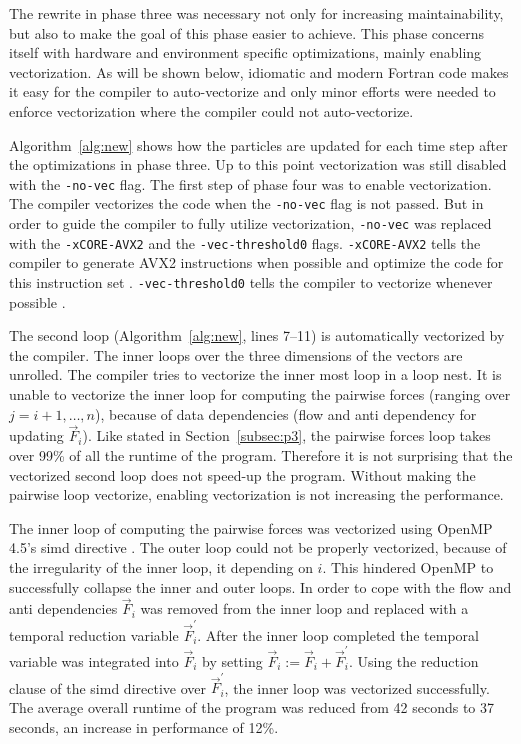 \documentclass[twoside,11pt]{article}
\begin{document}
The rewrite in phase three was necessary not only for increasing
maintainability, but also to make the goal of this phase easier to
achieve.
This phase concerns itself with hardware and environment specific
optimizations, mainly enabling vectorization.
As will be shown below, idiomatic and modern Fortran code makes it
easy for the compiler to auto-vectorize and only minor efforts were
needed to enforce vectorization where the compiler could not
auto-vectorize.

Algorithm~\ref{alg:new} shows how the particles are updated for each
time step after the optimizations in phase three.
Up to this point vectorization was still disabled with the
\texttt{-no-vec} flag.
The first step of phase four was to enable vectorization.
The compiler vectorizes the code when the \texttt{-no-vec} flag is
not passed.
But in order to guide the compiler to fully utilize vectorization,
\texttt{-no-vec} was replaced with the \texttt{-xCORE-AVX2} and the
\texttt{-vec-threshold0} flags.
\texttt{-xCORE-AVX2} tells the compiler to generate AVX2 instructions
when possible and optimize the code for this instruction set
\citep{xcore_avx2}.
\texttt{-vec-threshold0} tells the compiler to vectorize whenever
possible \citep{vec_threshold0}.

The second loop (Algorithm~\ref{alg:new}, lines 7--11)
is automatically vectorized by the compiler.
The inner loops over the three dimensions of the vectors are unrolled.
The compiler tries to vectorize the inner most loop in a loop nest.
It is unable to vectorize the inner loop for computing the pairwise
forces (ranging over $j=i+1,\dots,n$), because of data dependencies
(flow and anti dependency for updating $\vec{F}_i$).
Like stated in Section~\ref{subsec:p3}, the pairwise forces loop takes
over 99\% of all the runtime of the program.
Therefore it is not surprising that the vectorized second loop does
not speed-up the program.
Without making the pairwise loop vectorize, enabling vectorization is
not increasing the performance.

The inner loop of computing the pairwise forces was vectorized using
OpenMP 4.5's simd directive \citep{omp}.
The outer loop could not be properly vectorized, because of the
irregularity of the inner loop, it depending on $i$.
This hindered OpenMP to successfully collapse the inner and outer
loops.
In order to cope with the flow and anti dependencies $\vec{F}_i$ was
removed from the inner loop and replaced with a temporal reduction
variable $\vec{F}^\prime_i$.
After the inner loop completed the temporal variable was integrated
into $\vec{F}_i$ by setting
$\vec{F}_i := \vec{F}_i + \vec{F}^\prime_i$.
Using the reduction clause of the simd directive over
$\vec{F}^\prime_i$, the inner loop was vectorized successfully.
The average overall runtime of the program was reduced from 42 seconds
to 37 seconds, an increase in performance of 12\%.
\end{document}
